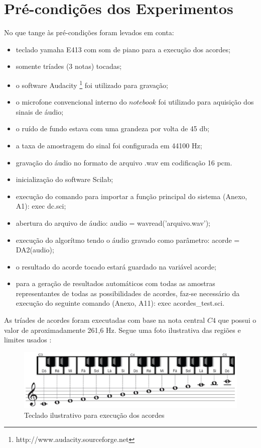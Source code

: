 \section{Pré-condições dos Experimentos}
\label{sec:precondicoes}

No que tange às pré-condições foram levados em conta:
\begin{itemize}
    \item teclado yamaha E413 com som de piano para a execução dos acordes;
    \item somente tríades (3 notas) tocadas;
    \item o software Audacity \footnote{http://www.audacity.sourceforge.net} foi utilizado para gravação;
    \item o microfone convencional interno do $notebook$ foi utilizado para aquisição dos sinais de áudio;
    \item o ruído de fundo estava com uma grandeza por volta de 45 db;
    \item a taxa de amostragem do sinal foi configurada em 44100 Hz;
    \item gravação do áudio no formato de arquivo .wav em codificação 16 pcm.
    \item inicialização do software Scilab;
    \item execução do comando para importar a função principal do sistema (Anexo, A1): exec dc.sci;
    \item abertura do arquivo de áudio: audio = wavread('arquivo.wav');
    \item execução do algorítmo tendo o áudio gravado como parâmetro: acorde = DA2(audio);
    \item o resultado do acorde tocado estará guardado na variável acorde;
    \item para a geração de resultados automáticos com todas as amostras representantes de todas as possibilidades de acordes, faz-se necessário da execução do seguinte comando (Anexo, A11): exec acordes{\_}test.sci.
\end{itemize}

\newpage
As tríades de acordes foram executadas com base na nota central $C4$ que possui o valor de aproximadamente 261,6 Hz. Segue uma foto ilustrativa das regiões e limites usados \cite{teclado}:

\begin{figure}[h]
	\centering
		\includegraphics[keepaspectratio=true,scale=0.4]{figuras/teclado-tcc1.eps}
	\caption{Teclado ilustrativo para execução dos acordes}
\end{figure}

